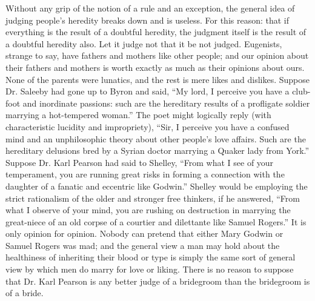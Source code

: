 \documentclass{book}
\begin{document}
Without any grip of the notion of a rule and an exception, the general idea of judging people’s heredity breaks down and is useless. For this reason: that if everything is the result of a doubtful heredity, the judgment itself is the result of a doubtful heredity also. Let it judge not that it be not judged. Eugenists, strange to say, have fathers and mothers like other people; and our opinion about their fathers and mothers is worth exactly as much as their opinions about ours. None of the parents were lunatics, and the rest is mere likes and dislikes. Suppose Dr. Saleeby had gone up to Byron and said, “My lord, I perceive you have a club-foot and inordinate passions: such are the hereditary results of a profligate soldier marrying a hot-tempered woman.” The poet might logically reply (with characteristic lucidity and impropriety), “Sir, I perceive you have a confused mind and an unphilosophic theory about other people’s love affairs. Such are the hereditary delusions bred by a Syrian doctor marrying a Quaker lady from York.” Suppose Dr. Karl Pearson had said to Shelley, “From what I see of your temperament, you are running great risks in forming a connection with the daughter of a fanatic and eccentric like Godwin.” Shelley would be employing the strict rationalism of the older and stronger free thinkers, if he answered, “From what I observe of your mind, you are rushing on destruction in marrying the great-niece of an old corpse of a courtier and dilettante like Samuel Rogers.” It is only opinion for opinion. Nobody can pretend that either Mary Godwin or Samuel Rogers was mad; and the general view a man may hold about the healthiness of inheriting their blood or type is simply the same sort of general view by which men do marry for love or liking. There is no reason to suppose that Dr. Karl Pearson is any better judge of a bridegroom than the bridegroom is of a bride.
\end{document}
